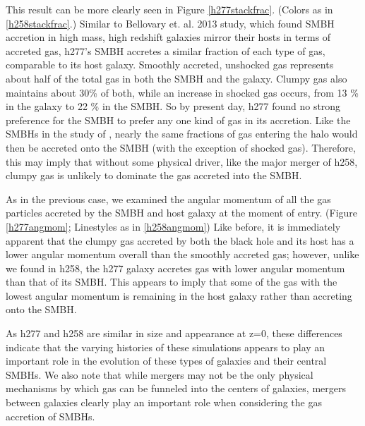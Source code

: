 \documentclass[manuscript]{aastex}
\begin{document}
This result can be more clearly seen in Figure \ref{h277stackfrac}. (Colors as in \ref{h258stackfrac}.) Similar to Bellovary et. al. 2013 study, which found SMBH accretion in high mass, high redshift galaxies mirror their hosts in terms of accreted gas, h277's SMBH accretes a similar fraction of each type of gas, comparable to its host galaxy. Smoothly accreted, unshocked gas represents about half of the total gas in both the SMBH and the galaxy. Clumpy gas also maintains about 30\% of both, while an increase in shocked gas occurs, from 13 \% in the galaxy to 22 \% in the SMBH. %
So by present day, h277 found no strong preference for the SMBH to prefer any one kind of gas in its accretion. Like the SMBHs in the study of \cite{Bellovary2013}, nearly the same fractions of gas entering the halo would then be accreted onto the SMBH (with the exception of shocked gas). Therefore, this may imply that without some physical driver, like the major merger of h258, clumpy gas is unlikely to dominate the gas accreted into the SMBH.

As in the previous case, we examined the angular momentum of all the gas particles accreted by the SMBH and host galaxy at the moment of entry. (Figure \ref{h277angmom}; Linestyles as in \ref{h258angmom}) Like before, it is immediately apparent that the clumpy gas accreted by both the black hole and its host has a lower angular momentum overall than the smoothly accreted gas; however, unlike we found in h258, the h277 galaxy accretes gas with lower angular momentum than that of its SMBH. This appears to imply that some of the gas with the lowest angular momentum is remaining in the host galaxy rather than accreting onto the SMBH. 


As h277 and h258 are similar in size and appearance at z=0, these differences indicate that the varying histories of these simulations appears to play an important role in the evolution of these types of galaxies and their central SMBHs. We also note that while mergers may not be the only physical mechanisms by which gas can be funneled into the centers of galaxies, mergers between galaxies clearly play an important role when considering the gas accretion of SMBHs.
\end{document}

